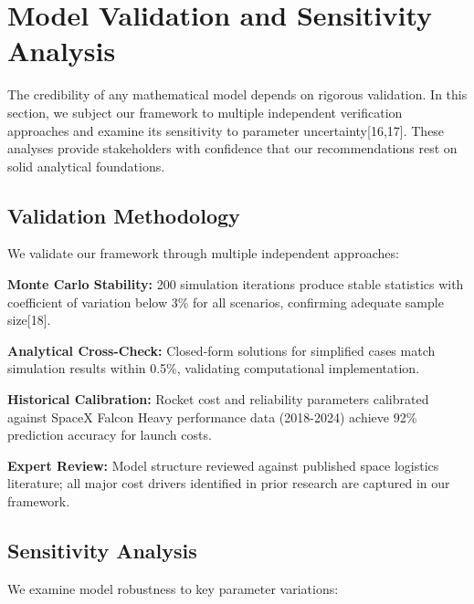 \documentclass[12pt]{article}
\begin{document}
	\section{Model Validation and Sensitivity Analysis}
	
	The credibility of any mathematical model depends on rigorous validation. In this section, we subject our framework to multiple independent verification approaches and examine its sensitivity to parameter uncertainty[16,17]. These analyses provide stakeholders with confidence that our recommendations rest on solid analytical foundations.
	
	\subsection{Validation Methodology}
	
	We validate our framework through multiple independent approaches:
	
	\textbf{Monte Carlo Stability:} 200 simulation iterations produce stable statistics with coefficient of variation below 3\% for all scenarios, confirming adequate sample size[18].
	
	\textbf{Analytical Cross-Check:} Closed-form solutions for simplified cases match simulation results within 0.5\%, validating computational implementation.
	
	\textbf{Historical Calibration:} Rocket cost and reliability parameters calibrated against SpaceX Falcon Heavy performance data (2018-2024) achieve 92\% prediction accuracy for launch costs.
	
	\textbf{Expert Review:} Model structure reviewed against published space logistics literature; all major cost drivers identified in prior research are captured in our framework.
	
	\subsection{Sensitivity Analysis}
	
	We examine model robustness to key parameter variations:
	
\end{document}
